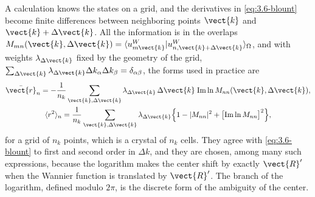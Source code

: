 A calculation knows the states on a grid, and the derivatives in \cref{eq:3.6-blount} become finite differences between neighboring points $\vect{k}$ and $\vect{k} + \Delta\vect{k}$. All the information is in the overlaps $M_{mn}(\vect{k},\Delta\vect{k}) = \langle u^W_{m\vect{k}}|u^W_{n,\vect{k}+\Delta\vect{k}}\rangle_\Omega$, and with weights $\lambda_{\Delta\vect{k}}$ fixed by the geometry of the grid, $\sum_{\Delta\vect{k}}\lambda_{\Delta\vect{k}}\Delta k_\alpha\Delta k_\beta = \delta_{\alpha\beta}$, the forms used in practice are~\cite[Eqs.~(31) and (32)]{marzari1997maximally}
\begin{equation}
  \begin{gathered}
  \bar{\vect{r}}_n = -\frac{1}{n_k}\sum_{\vect{k},\Delta\vect{k}}\lambda_{\Delta\vect{k}}\,\Delta\vect{k}\;\mathrm{Im}\ln M_{nn}(\vect{k},\Delta\vect{k}), \\
  \langle r^2\rangle_n = \frac{1}{n_k}\sum_{\vect{k},\Delta\vect{k}}\lambda_{\Delta\vect{k}}\Bigl\{1 - |M_{nn}|^2 + \bigl[\mathrm{Im}\ln M_{nn}\bigr]^2\Bigr\} ,
  \end{gathered}
  \label{eq:3.6-discrete}
\end{equation}
for a grid of $n_k$ points, which is a crystal of $n_k$ cells. They agree with \cref{eq:3.6-blount} to first and second order in $\Delta k$, and they are chosen, among many such expressions, because the logarithm makes the center shift by exactly $\vect{R}'$ when the Wannier function is translated by $\vect{R}'$. The branch of the logarithm, defined modulo $2\pi$, is the discrete form of the ambiguity of the center.

